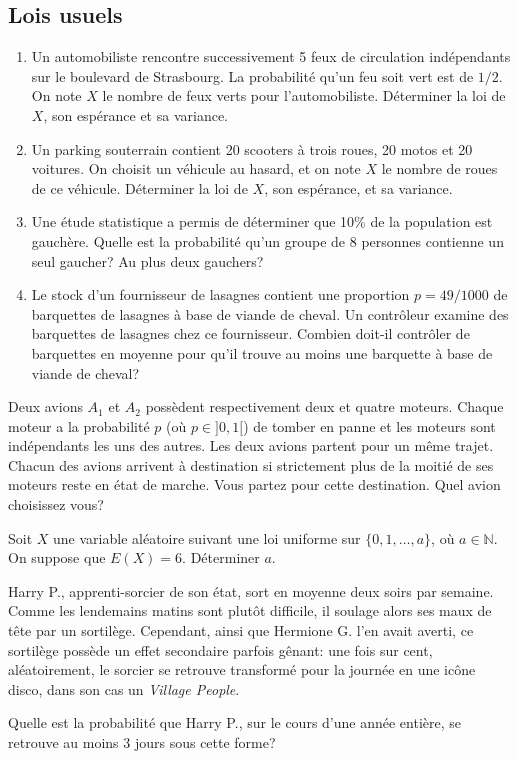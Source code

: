 \documentclass{book}
\begin{document}
\subsection*{Lois usuels}
\begin{Exercice}
\begin{enumerate}
\item
  Un automobiliste rencontre successivement 5 feux de circulation indépendants sur le boulevard de Strasbourg.
  La probabilité qu'un feu soit vert est de $1/2$.
  On note $X$ le nombre de feux verts pour l'automobiliste.
  Déterminer la loi de $X$, son espérance et sa variance.
\item
  Un parking souterrain contient 20 scooters à trois roues, 20 motos et 20 voitures.
  On choisit un véhicule au hasard, et on note $X$ le nombre de roues de ce véhicule.
  Déterminer la loi de $X$, son espérance, et sa variance.
\item
  Une étude statistique a permis de déterminer que 10\% de la population est gauchère.
  Quelle est la probabilité qu'un groupe de 8 personnes contienne un seul gaucher?
  Au plus deux gauchers?
\item
  Le stock d'un fournisseur de lasagnes contient une proportion $p = 49/1000$
  de barquettes de lasagnes à base de viande de cheval.
  Un contrôleur examine des barquettes de lasagnes chez ce fournisseur.
  Combien doit-il contrôler de barquettes en moyenne pour qu'il trouve au moins une barquette à base de viande de cheval?
\end{enumerate}
\end{Exercice}
\begin{Exercice}[Avions]
Deux avions $A_1$ et $A_2$ possèdent respectivement deux et quatre moteurs.
Chaque moteur a la probabilité $p$ (où $p\in ]0,1[$) de tomber en panne
et les moteurs sont indépendants les uns des autres.
Les deux avions partent pour un même trajet.
Chacun des avions arrivent à destination si strictement plus de la moitié de ses moteurs reste en état de marche.
Vous partez pour cette destination.
Quel avion choisissez vous?
\end{Exercice}

\begin{Exercice}
Soit $X$ une variable aléatoire suivant une loi uniforme sur $\{0,1,\dots,a\}$, où $a\in\mathbb N$. On suppose que $E(X)=6$. Déterminer $a$.
\end{Exercice}
\begin{Exercice}
Harry P., apprenti-sorcier de son état, sort en moyenne deux soirs par semaine.
Comme les lendemains matins sont plutôt difficile, il soulage alors ses maux de tête par un sortilège.
Cependant, ainsi que Hermione G. l'en avait averti, ce sortilège possède un effet secondaire parfois gênant:
une fois sur cent, aléatoirement, le sorcier se retrouve transformé pour la journée en une icône disco, dans son cas un \emph{Village People}.

Quelle est la probabilité que Harry P., sur le cours d'une année entière, se retrouve au moins 3 jours sous cette forme?
\end{Exercice}
\end{document}
